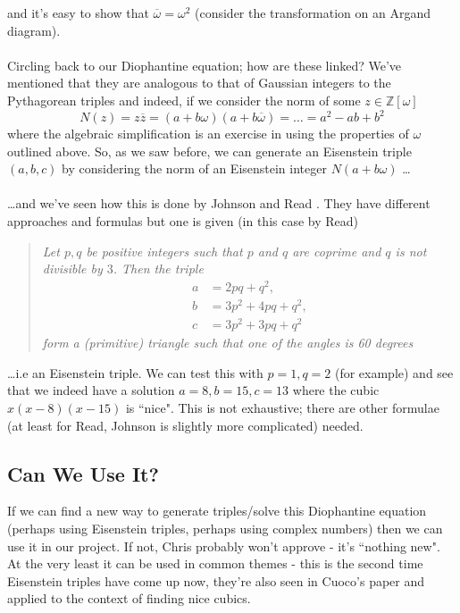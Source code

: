 \documentclass[12pt]{article}
\newcommand*\conj[1]{\overline{#1}}
\newcommand{\Z}{\mathbb{Z}}
\begin{document}
and it's easy to show that $\conj{\omega} = \omega^2$ (consider the transformation on an Argand diagram).\\\\
Circling back to our Diophantine equation; how are these linked? We've mentioned that they are analogous to that of Gaussian integers to the Pythagorean triples and indeed, if we consider the norm of some $z \in \Z[\omega]$
\begin{equation*}
    N(z) = z\conj{z} = (a+b\omega)(a+b\conj{\omega}) = \dots = a^2 - ab + b^2
\end{equation*}
where the algebraic simplification is an exercise in using the properties of $\omega$ outlined above. So, as we saw before, we can generate an Eisenstein triple $(a, b, c)$ by considering the norm of an Eisenstein integer $N(a + b\omega)$ \dots\\\\
\dots and we've seen how this is done by Johnson \cite{johnson2011} and Read \cite{read2006}. They have different approaches and formulas but one is given (in this case by Read)
\begin{quote}
    \textit{Let $p, q$ be positive integers such that $p$ and $q$ are coprime and $q$ is not divisible by $3$. Then the triple
    \begin{align*}
        a &= 2pq + q^2,\\
        b &= 3p^2 + 4pq + q^2,\\
        c &= 3p^2 + 3pq + q^2
    \end{align*}
    form a (primitive) triangle such that one of the angles is 60 degrees}
\end{quote}
\dots i.e an Eisenstein triple. We can test this with $p = 1, q = 2$ (for example) and see that we indeed have a solution $a = 8, b = 15, c= 13$ where the cubic $x(x-8)(x-15)$ is ``nice". This is not exhaustive; there are other formulae (at least for Read, Johnson is slightly more complicated) needed.

\subsection{Can We Use It?}
If we can find a new way to generate triples/solve this Diophantine equation (perhaps using Eisenstein triples, perhaps using complex numbers) then we can use it in our project. If not, Chris probably won't approve - it's ``nothing new". At the very least it can be used in common themes - this is the second time Eisenstein triples have come up now, they're also seen in Cuoco's paper \autocite{cuoco2000} and applied to the context of finding nice cubics.
\end{document}
